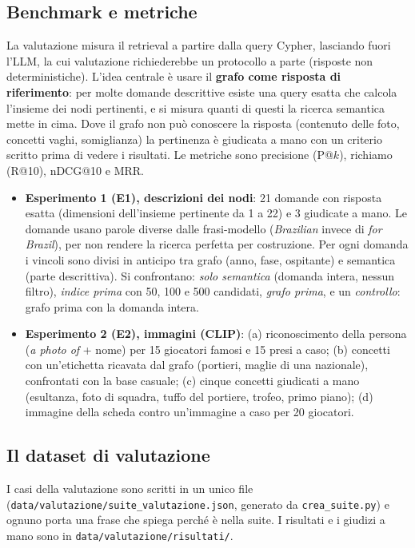 \documentclass[11pt,a4paper]{article}
\newcommand{\code}[1]{\texttt{\small #1}}
\begin{document}
\subsection{Benchmark e metriche}
La valutazione misura il retrieval a partire dalla query Cypher, lasciando fuori l'LLM, la cui valutazione richiederebbe un protocollo a parte (risposte non deterministiche). L'idea centrale è usare il \textbf{grafo come risposta di riferimento}: per molte domande descrittive esiste una query esatta che calcola l'insieme dei nodi pertinenti, e si misura quanti di questi la ricerca semantica mette in cima. Dove il grafo non può conoscere la risposta (contenuto delle foto, concetti vaghi, somiglianza) la pertinenza è giudicata a mano con un criterio scritto prima di vedere i risultati. Le metriche sono precisione (P@$k$), richiamo (R@10), nDCG@10 e MRR.
\begin{itemize}
  \item \textbf{Esperimento 1 (E1), descrizioni dei nodi}: 21 domande con risposta esatta (dimensioni dell'insieme pertinente da 1 a 22) e 3 giudicate a mano. Le domande usano parole diverse dalle frasi-modello (\emph{Brazilian} invece di \emph{for Brazil}), per non rendere la ricerca perfetta per costruzione. Per ogni domanda i vincoli sono divisi in anticipo tra grafo (anno, fase, ospitante) e semantica (parte descrittiva). Si confrontano: \emph{solo semantica} (domanda intera, nessun filtro), \emph{indice prima} con 50, 100 e 500 candidati, \emph{grafo prima}, e un \emph{controllo}: grafo prima con la domanda intera.
  \item \textbf{Esperimento 2 (E2), immagini (CLIP)}: (a) riconoscimento della persona (\emph{a photo of} + nome) per 15 giocatori famosi e 15 presi a caso; (b) concetti con un'etichetta ricavata dal grafo (portieri, maglie di una nazionale), confrontati con la base casuale; (c) cinque concetti giudicati a mano (esultanza, foto di squadra, tuffo del portiere, trofeo, primo piano); (d) immagine della scheda contro un'immagine a caso per 20 giocatori.
\end{itemize}

\subsection{Il dataset di valutazione}
I casi della valutazione sono scritti in un unico file (\code{data/valutazione/suite\_valutazione.json}, generato da \code{crea\_suite.py}) e ognuno porta una frase che spiega perché è nella suite. I risultati e i giudizi a mano sono in \code{data/valutazione/risultati/}.
\end{document}
